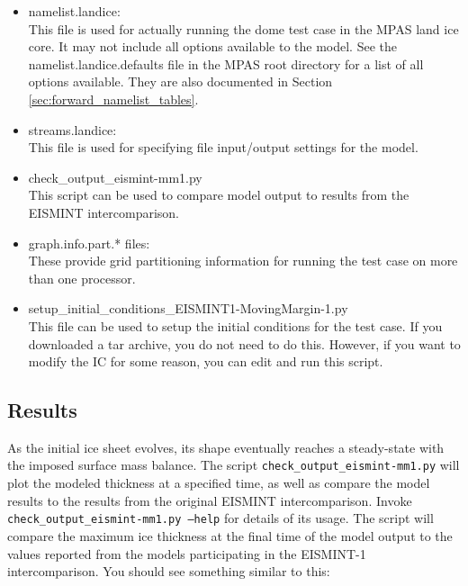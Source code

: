 \begin{itemize}
\item namelist.landice: \\
	This file is used for actually running the dome test case in the MPAS land ice core.  It may not include all options available to the model.  See the namelist.landice.defaults file in the MPAS root directory for a list of all options available.  They are also documented in Section \ref{sec:forward_namelist_tables}.

\item streams.landice: \\
	This file is used for specifying file input/output settings for the model.

\item check\_output\_eismint-mm1.py \\
This script can be used to compare model output to results from the EISMINT intercomparison.


\item graph.info.part.* files: \\ 
		These provide grid partitioning information for running the test case on more than one processor.  

\item setup\_initial\_conditions\_EISMINT1-MovingMargin-1.py \\
This file can be used to setup the initial conditions for the test case.  If you downloaded a tar archive, you do not need to do this.  However, if you want to modify the IC for some reason, you can edit and run this script.

\end{itemize}

\subsection{Results}
\label{subsecc:eismint_results}
As the initial ice sheet evolves, its shape eventually reaches a steady-state with the imposed surface mass balance.  
The script \texttt{check\_output\_eismint-mm1.py} will plot the modeled thickness at a specified time, 
as well as compare the model results to the results from the original EISMINT intercomparison.  
Invoke \texttt{check\_output\_eismint-mm1.py --help} for details of its usage.  
The script will compare the maximum ice thickness at the final time of the model output 
to the values reported from the models participating in the EISMINT-1 intercomparison.  
You should see something similar to this:

